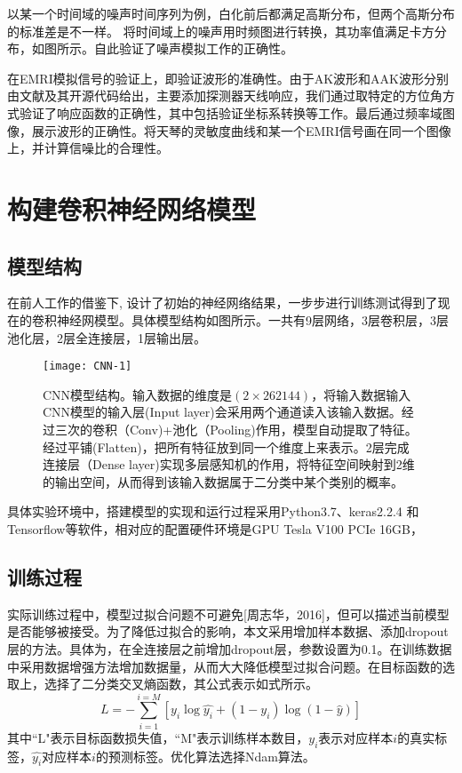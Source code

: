 以某一个时间域的噪声时间序列为例，白化前后都满足高斯分布，但两个高斯分布的标准差是不一样。
将时间域上的噪声用时频图进行转换，其功率值满足卡方分布，如图所示。自此验证了噪声模拟工作的正确性。

在EMRI模拟信号的验证上，即验证波形的准确性。由于AK波形和AAK波形分别由文献\cite{chua2015improved}及其开源代码给出，主要添加探测器天线响应，我们通过取特定的方位角方式验证了响应函数的正确性，其中包括验证坐标系转换等工作。最后通过频率域图像，展示波形的正确性。将天琴的灵敏度曲线和某一个EMRI信号画在同一个图像上，并计算信噪比的合理性。


\section{构建卷积神经网络模型}

\subsection{模型结构}
在前人工作的借鉴下\cite{Hunter2018:PhysRevLett.120.141103, George:2016hay}, 设计了初始的神经网络结果，一步步进行训练测试得到了现在的卷积神经网模型。具体模型结构如图所示。一共有9层网络，3层卷积层，3层池化层，2层全连接层，1层输出层。

\begin{figure}[!htbp]
 \centering
 \texttt{[image: CNN-1]}
    \caption[CNN模型结构]{\label{fig:CNN-arch}CNN模型结构。输入数据的维度是$(2 \times 262144)$，将输入数据输入CNN模型的输入层(Input layer)会采用两个通道读入该输入数据。经过三次的卷积（Conv)+池化（Pooling)作用，模型自动提取了特征。经过平铺(Flatten)，把所有特征放到同一个维度上来表示。2层完成连接层（Dense layer)实现多层感知机的作用，将特征空间映射到2维的输出空间，从而得到该输入数据属于二分类中某个类别的概率。}
\end{figure}

具体实验环境中，搭建模型的实现和运行过程采用Python3.7、keras2.2.4 和 Tensorflow等软件，相对应的配置硬件环境是GPU Tesla V100 PCIe 16GB，


\subsection{训练过程}
实际训练过程中，模型过拟合问题不可避免[周志华，2016]\cite{zhou2016machine}\cite{ng2013unsupervised}，但可以描述当前模型是否能够被接受。为了降低过拟合的影响，本文采用增加样本数据、添加dropout层的方法。具体为，在全连接层之前增加dropout层，参数设置为0.1。在训练数据中采用数据增强方法增加数据量，从而大大降低模型过拟合问题。在目标函数的选取上，选择了二分类交叉熵函数，其公式表示如式所示。
\begin{equation}
L=-\sum_{i=1}^{i=M}[y_i \log \hat{y_i}+(1-y_i)\log(1-\hat{y})]
\end{equation}
其中“L"表示目标函数损失值，``M"表示训练样本数目，$y_i$表示对应样本$i$的真实标签，$\hat{y_i}$对应样本$i$的预测标签。优化算法选择Ndam算法\cite{dozat2016incorporating}。

